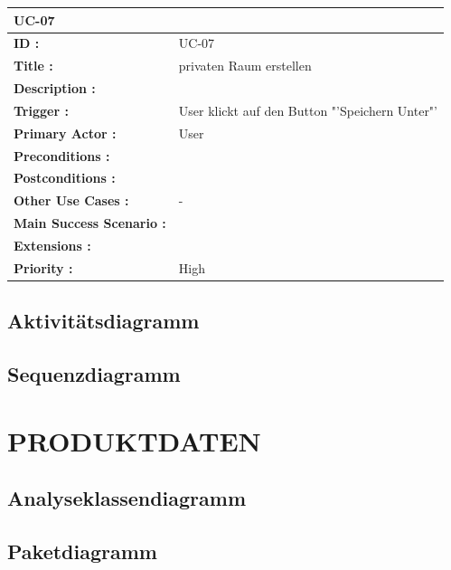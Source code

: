 	\begin{table}[H]
		\begin{tabular}{|p{8cm}|p{8cm}|}
			\hline
			\textbf{UC-07 } \\ 
			\hline
			\textbf{ID :}\centering & UC-07  \\ \hline 
			\textbf{Title :}\centering & privaten Raum erstellen \\ \hline 
			\textbf{Description :}\centering &  \\ \hline 
			\textbf{Trigger :}\centering & User klickt auf den Button "'Speichern Unter"' \\ \hline 
			\textbf{Primary Actor :} \centering & User \\ \hline 
			\textbf{Preconditions :}\centering & \\ \hline 
			\textbf{Postconditions :}\centering	& 
			\\ \hline		
			\textbf{Other Use Cases :}\centering & - \\ \hline  
			\textbf{Main Success Scenario :}\centering &
			\\ \hline  
			\textbf{Extensions :}\centering & \\ \hline  
			\textbf{Priority :}\centering & High \\ \hline  
		\end{tabular}
	\end{table}			
	
	\subsection{Aktivitätsdiagramm}

	\subsection{Sequenzdiagramm}
	
	
\newpage
	\section{\Large PRODUKTDATEN}
	
	\subsection{Analyseklassendiagramm}	
	
	\subsection{Paketdiagramm}
	

